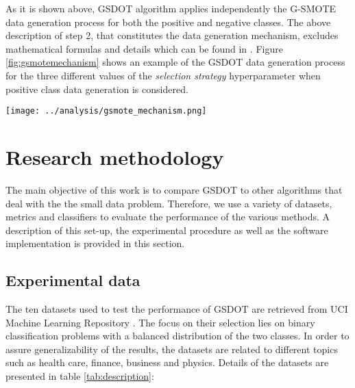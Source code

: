 As it is shown above, GSDOT algorithm applies independently the G-SMOTE data generation process for both the positive and negative classes. The above description of step 2, that constitutes the data generation mechanism,  excludes mathematical formulas and details which can be found in \cite{Douzas.2019}. Figure \ref{fig:gsmotemechanism} shows an example of the GSDOT data generation process for the three different values of the \textit{selection strategy} hyperparameter when positive class data generation is considered.

\begin{figure*}
	\centering
	\texttt{[image: ../analysis/gsmote\_mechanism.png]}
	\caption{The GSDOT data generation mechanism for the three  different \textit{selection strategy} values, when positive class samples are generated. The hyperparameters \textit{deformation factor} and \textit{truncation factor} have also different values resulting in the permissible data generation areas of the figure.}
	\label{fig:gsmotemechanism}
\end{figure*}

\section{Research methodology}
\label{research}

The main objective of this work is to compare GSDOT to other algorithms that deal with the the small data problem. Therefore, we use a variety of datasets, metrics and classifiers to evaluate the performance of the various methods. A description of this set-up, the experimental procedure as well as the software implementation is provided in this section.

\subsection{Experimental data}

The ten datasets used to test the performance of GSDOT are retrieved from UCI Machine Learning Repository \cite{Dua.2019}. The focus on their selection lies on binary classification problems with a balanced distribution of the two classes. In order to assure generalizability of the results, the datasets are related to different topics such as health care, finance, business and physics. Details of the datasets are presented in table \ref{tab:description}:

